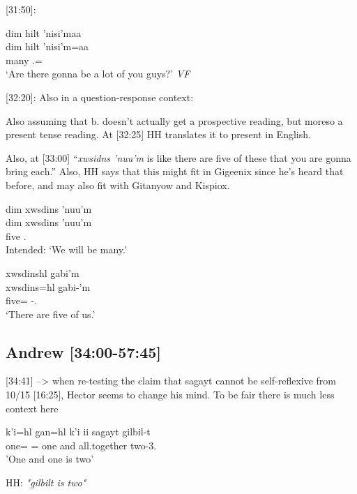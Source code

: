 [31:50]:

\begin{exe}
    \ex \glll dim hilt 'nisi'maa  \\
    dim hilt 'nisi'm=aa \\
    \Prosp{} many \Spl{}.\Iii{}=\Q{}  \\ 
    `Are there gonna be a lot of you guys?' \textit{VF}
\end{exe}

[32:20]: Also in a question-response context: 

Also assuming that b. doesn't actually get a prospective reading, but moreso a present tense reading. At [32:25] HH translates it to present in English.

Also, at [33:00] ``\textit{xwsidns 'nuu'm} is like there are five of these that you are gonna bring each.'' Also, HH says that this might fit in Gigeenix since he's heard that before, and may also fit with Gitanyow and Kispiox.

\begin{exe}
    \ex
    \begin{xlist}
        \item \glll * dim xwsdins 'nuu'm  \\
    {} dim xwsdins 'nuu'm \\
    {} \Prosp{} five \Fpl{}.\Iii{} \\
    Intended: `We will be many.'
    \item xwsdinshl g̱abi'm  \\
    xwsdins=hl g̱abi-'m \\
    five=\Cn{} \Cnt{}-\Fpl{}.\Ii{}  \\ 
    `There are five of us.'
    \end{xlist}
\end{exe}

\subsection{Andrew [34:00-57:45]}


[34:41] --> when re-testing the claim that sag̱ayt cannot be self-reflexive from 10/15 [16:25], Hector seems to change his mind. To be fair there is much less context here
\begin{exe}
\ex \gll k'i=hl g̱an=hl k'i ii sag̱ayt gilbil-t\\
one=\Cn{} \Pcnj{}=\Cn{} one and all.together two-3.\Ii{}\\
'One and one is two'
\end{exe}
HH: \textit{"gilbilt is two"}

